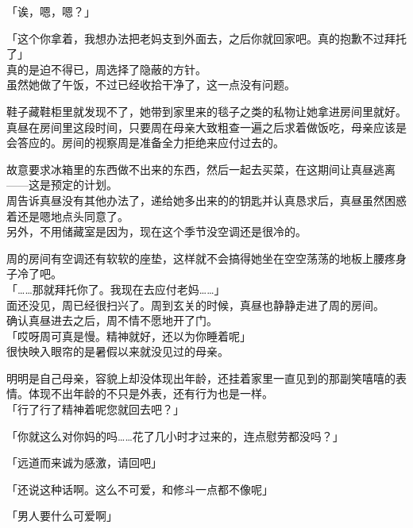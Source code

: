 「诶，嗯，嗯？」

「这个你拿着，我想办法把老妈支到外面去，之后你就回家吧。真的抱歉不过拜托了」\\

真的是迫不得已，周选择了隐蔽的方针。\\

虽然她做了午饭，不过已经收拾干净了，这一点没有问题。

鞋子藏鞋柜里就发现不了，她带到家里来的毯子之类的私物让她拿进房间里就好。\\

真昼在房间里这段时间，只要周在母亲大致粗查一遍之后求着做饭吃，母亲应该是会答应的。房间的视察周是准备全力拒绝来应付过去的。

故意要求冰箱里的东西做不出来的东西，然后一起去买菜，在这期间让真昼逃离——这是预定的计划。\\

周告诉真昼没有其他办法了，递给她多出来的的钥匙并认真恳求后，真昼虽然困惑着还是嗯地点头同意了。\\

另外，不用储藏室是因为，现在这个季节没空调还是很冷的。

周的房间有空调还有软软的座垫，这样就不会搞得她坐在空空荡荡的地板上腰疼身子冷了吧。\\

「……那就拜托你了。我现在去应付老妈……」\\

面还没见，周已经很扫兴了。周到玄关的时候，真昼也静静走进了周的房间。\\

确认真昼进去之后，周不情不愿地开了门。\\

「哎呀周可真是慢。精神就好，还以为你睡着呢」\\

很快映入眼帘的是暑假以来就没见过的母亲。

明明是自己母亲，容貌上却没体现出年龄，还挂着家里一直见到的那副笑嘻嘻的表情。体现不出年龄的不只是外表，还有行为也是一样。\\

「行了行了精神着呢您就回去吧？」

「你就这么对你妈的吗……花了几小时才过来的，连点慰劳都没吗？」

「远道而来诚为感激，请回吧」

「还说这种话啊。这么不可爱，和修斗一点都不像呢」

「男人要什么可爱啊」\\

